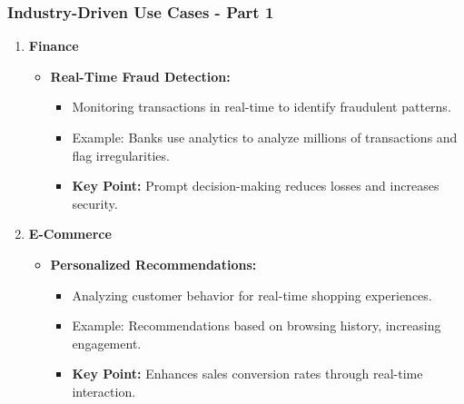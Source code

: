 \documentclass[aspectratio=169]{beamer}
\begin{document}
\begin{frame}[fragile]
    \frametitle{Industry-Driven Use Cases - Part 1}
    \begin{enumerate}
        \item \textbf{Finance}
            \begin{itemize}
                \item \textbf{Real-Time Fraud Detection:}
                \begin{itemize}
                    \item Monitoring transactions in real-time to identify fraudulent patterns.
                    \item Example: Banks use analytics to analyze millions of transactions and flag irregularities.
                    \item \textbf{Key Point:} Prompt decision-making reduces losses and increases security.
                \end{itemize}
            \end{itemize}
        
        \item \textbf{E-Commerce}
            \begin{itemize}
                \item \textbf{Personalized Recommendations:}
                \begin{itemize}
                    \item Analyzing customer behavior for real-time shopping experiences.
                    \item Example: Recommendations based on browsing history, increasing engagement.
                    \item \textbf{Key Point:} Enhances sales conversion rates through real-time interaction.
                \end{itemize}
            \end{itemize}
    \end{enumerate}
\end{frame}
\end{document}
